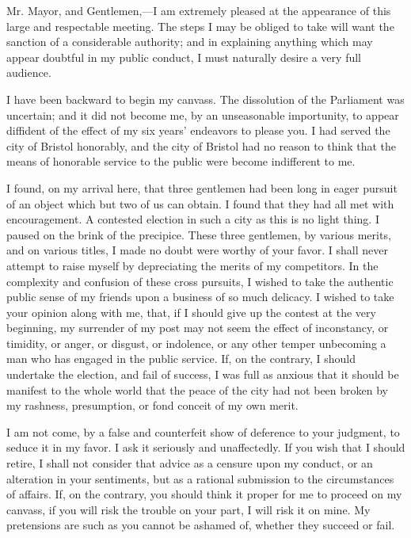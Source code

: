 Mr. Mayor, and Gentlemen,—I am extremely pleased at the appearance of this large and respectable meeting. The steps I may be obliged to take will want the sanction of a considerable authority; and in explaining anything which may appear doubtful in my public conduct, I must naturally desire a very full audience.

I have been backward to begin my canvass. The dissolution of the Parliament was uncertain; and it did not become me, by an unseasonable importunity, to appear diffident of the effect of my six years' endeavors to please you. I had served the city of Bristol honorably, and the city of Bristol had no reason to think that the means of honorable service to the public were become indifferent to me.

I found, on my arrival here, that three gentlemen had been long in eager pursuit of an object which but two of us can obtain. I found that they had all met with encouragement. A contested election in such a city as this is no light thing. I paused on the brink of the precipice. These three gentlemen, by various merits, and on various titles, I made no doubt were worthy of your favor. I shall never attempt to raise myself by depreciating the merits of my competitors. In the complexity and confusion of these cross pursuits, I wished to take the authentic public sense of my friends upon a business of so much delicacy. I wished to take your opinion along with me, that, if I should give up the contest at the very beginning, my surrender of my post may not seem the effect of inconstancy, or timidity, or anger, or disgust, or indolence, or any other temper unbecoming a man who has engaged in the public service. If, on the contrary, I should undertake the election, and fail of success, I was full as anxious that it should be manifest to the whole world that the peace of the city had not been broken by my rashness, presumption, or fond conceit of my own merit.

I am not come, by a false and counterfeit show of deference to your judgment, to seduce it in my favor. I ask it seriously and unaffectedly. If you wish that I should retire, I shall not consider that advice as a censure upon my conduct, or an alteration in your sentiments, but as a rational submission to the circumstances of affairs. If, on the contrary, you should think it proper for me to proceed on my canvass, if you will risk the trouble on your part, I will risk it on mine. My pretensions are such as you cannot be ashamed of, whether they succeed or fail.

